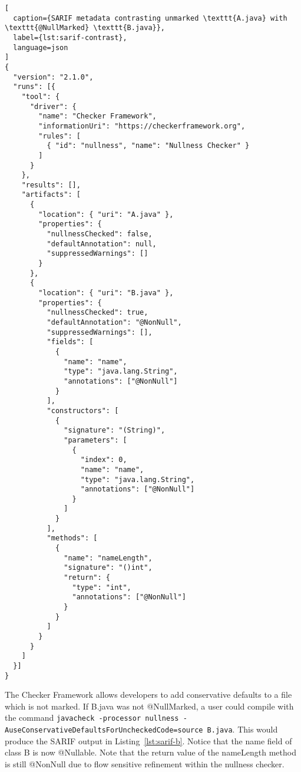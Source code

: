 \documentclass[12pt]{article}
\begin{document}
\begin{lstlisting}[
  caption={SARIF metadata contrasting unmarked \texttt{A.java} with \texttt{@NullMarked} \texttt{B.java}},
  label={lst:sarif-contrast},
  language=json
]
{
  "version": "2.1.0",
  "runs": [{
    "tool": {
      "driver": {
        "name": "Checker Framework",
        "informationUri": "https://checkerframework.org",
        "rules": [
          { "id": "nullness", "name": "Nullness Checker" }
        ]
      }
    },
    "results": [],
    "artifacts": [
      {
        "location": { "uri": "A.java" },
        "properties": {
          "nullnessChecked": false,
          "defaultAnnotation": null,
          "suppressedWarnings": []
        }
      },
      {
        "location": { "uri": "B.java" },
        "properties": {
          "nullnessChecked": true,
          "defaultAnnotation": "@NonNull",
          "suppressedWarnings": [],
          "fields": [
            {
              "name": "name",
              "type": "java.lang.String",
              "annotations": ["@NonNull"]
            }
          ],
          "constructors": [
            {
              "signature": "(String)",
              "parameters": [
                {
                  "index": 0,
                  "name": "name",
                  "type": "java.lang.String",
                  "annotations": ["@NonNull"]
                }
              ]
            }
          ],
          "methods": [
            {
              "name": "nameLength",
              "signature": "()int",
              "return": {
                "type": "int",
                "annotations": ["@NonNull"]
              }
            }
          ]
        }
      }
    ]
  }]
}
\end{lstlisting}

The Checker Framework allows developers to add conservative defaults to a file which is not marked. If B.java was not @NullMarked, a user could compile with the command \lstinline!javacheck -processor nullness -AuseConservativeDefaultsForUncheckedCode=source B.java!. This would produce the SARIF output in Listing~\ref{lst:sarif-b}. Notice that the name field of class B is now @Nullable. Note that the return value of the nameLength method is still @NonNull due to flow sensitive refinement within the nullness checker. 
\end{document}
